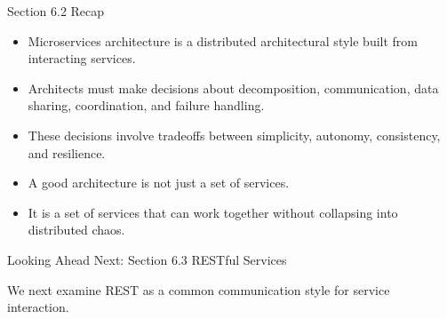\begin{frame}{Section 6.2 Recap}
\begin{itemize}
    \item Microservices architecture is a distributed architectural style built from interacting services.
    \item Architects must make decisions about decomposition, communication, data sharing, coordination, and failure handling.
    \item These decisions involve tradeoffs between simplicity, autonomy, consistency, and resilience.
    \item A good architecture is not just a set of services.
    \item It is a set of services that can work together without collapsing into distributed chaos.
\end{itemize}
\end{frame}

\begin{frame}{Looking Ahead}
\centering
\Large Next: Section 6.3 RESTful Services

\vspace{1em}

\normalsize
We next examine REST as a common communication style for service interaction.
\end{frame}
